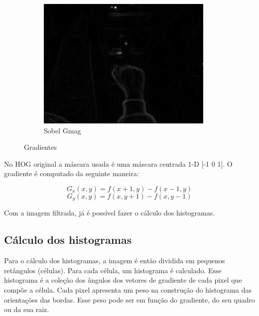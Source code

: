 \begin{figure}
    \begin{subfigure}[b]{0.3\textwidth}
        \includegraphics[width=\textwidth]{image/gradiente_sobel_mag.jpg}
        \caption{Sobel Gmag}
        \label{fig:gradiente_gmag}
    \end{subfigure}
    \caption{Gradientes}\label{fig:gradientes}
\end{figure}

No HOG original a máscara usada é uma máscara centrada 1-D [-1 0 1]. O gradiente é computado da seguinte maneira: \cite{dalal2005histograms}

\begin{equation}
	G_{x}(x,y) = f(x+1, y) - f(x-1, y)
\end{equation}
\begin{equation}
	G_{y}(x,y) = f(x, y+1) - f(x, y-1)
\end{equation}

Com a imagem filtrada, já é possível fazer o cálculo dos histogramas.

\subsection{Cálculo dos histogramas}

Para o cálculo dos histogramas, a imagem é então dividida em pequenos retângulos (células). Para cada célula, um histograma é calculado. Esse histograma é a coleção dos ângulos dos vetores de gradiente de cada pixel que compõe a célula. Cada pixel apresenta um peso na construção do histograma das orientações das bordas. Esse peso pode ser em função do gradiente, do seu quadro ou da sua raiz.

